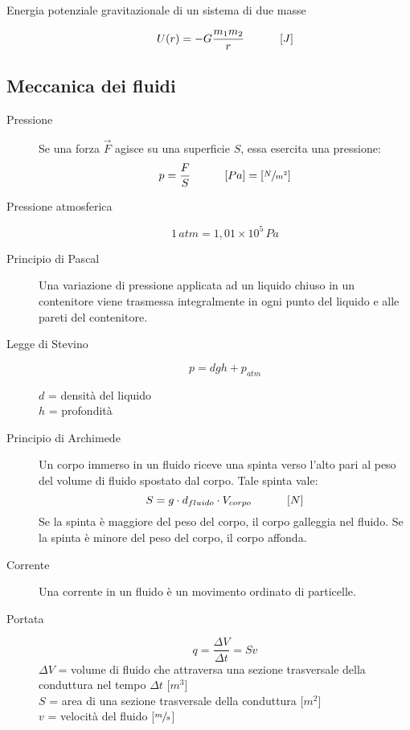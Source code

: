 \documentclass[a4paper,11pt,italian]{article}
\begin{document}
\begin{description}
  \item[Energia potenziale gravitazionale di un sistema di due masse] 
  \[ U(r) = - G \frac{m_1m_2}{r} \hspace*{3em} \left[ J \right] \]
\end{description}


\subsection{Meccanica dei fluidi}

\begin{description}
  \item[Pressione] 
  Se una forza $ \vec{F} $ agisce su una superficie $ S $, essa esercita una pressione:
  \[ p = \frac{F}{S} \hspace*{3em} [Pa] = \left[ \sfrac{N}{m^2} \right] \]
  
  \item[Pressione atmosferica]
  \[ 1 \, atm = 1,01 \times 10^5 \, Pa \]
  
  \item[Principio di Pascal] 
  Una variazione di pressione applicata ad un liquido chiuso in un contenitore viene trasmessa integralmente in ogni punto del liquido e alle pareti del contenitore.
  
  \item[Legge di Stevino]
  \[ p = dgh + p_{atm} \]
  \begin{multicols}{2}
  $ d $ = densità del liquido\\
  $ h $ = profondità
  \end{multicols}
  
  \item[Principio di Archimede] 
  Un corpo immerso in un fluido riceve una spinta verso l'alto pari al peso del volume di fluido spostato dal corpo. Tale spinta vale:
  \[ S = g \cdot d_{fluido} \cdot V_{corpo} \hspace*{3em} \left[ N \right] \]
  Se la spinta è maggiore del peso del corpo, il corpo galleggia nel fluido. Se la spinta è minore del peso del corpo, il corpo affonda.
  
  \item[Corrente] 
  Una corrente in un fluido è un movimento ordinato di particelle.
  
  \item[Portata]
  \[ q = \frac{\Delta V}{\Delta t} = Sv \]
  $ \Delta V $ = volume di fluido che attraversa una sezione trasversale della conduttura nel tempo $ \Delta t $ [$ m^3 $]\\
  $ S $ = area di una sezione trasversale della conduttura [$ m^2 $]\\
  $ v $ = velocità del fluido [$ \sfrac{m}{s} $]


\end{description}
\end{document}
